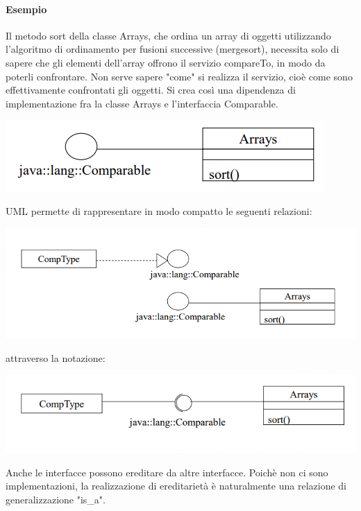 \documentclass{article}
\begin{document}
	\paragraph*{Esempio} Il metodo sort della classe Arrays, che ordina un array di oggetti utilizzando l'algoritmo di ordinamento per fusioni successive (mergesort), necessita solo di sapere che gli elementi dell'array offrono il servizio compareTo, in modo da poterli confrontare. Non serve sapere "come" si realizza il servizio, cioè come sono effettivamente confrontati gli oggetti. Si crea così una dipendenza di implementazione fra la classe Arrays e l'interfaccia Comparable.
	\begin{center}
		\includegraphics[scale=0.5]{assets/relazione_realizzazione_esempio2.png}
	\end{center}
	UML permette di rappresentare in modo compatto le seguenti relazioni:
	\begin{center}
		\includegraphics[scale=0.5]{assets/relazione_realizzazione_esempio3.png}
	\end{center}
	attraverso la notazione:
	\begin{center}
		\includegraphics[scale=0.5]{assets/relazione_realizzazione_esempio4.png}
	\end{center}
	Anche le interfacce possono ereditare da altre interfacce. Poichè non ci sono implementazioni, la realizzazione di ereditarietà è naturalmente una relazione di generalizzazione "is\_a". 
	\vspace{\baselineskip} \\
\end{document}
